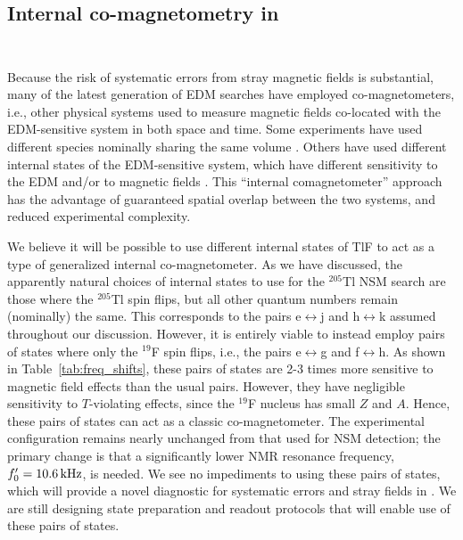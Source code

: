 \subsection{Internal co-magnetometry in \\ \CENTREX\ }
\label{Sec:InternalComagnetometry}

Because the risk of systematic errors from stray magnetic fields is substantial, many of the latest generation of EDM searches have employed co-magnetometers, i.e., other physical systems used to measure magnetic fields co-located with the EDM-sensitive system in both space and time.  Some experiments have used different species nominally sharing the same volume \cite{abel2020measurement,regan2002new}.  Others have used different internal states of the EDM-sensitive system, which have different sensitivity to the EDM and/or to magnetic fields \cite{EckelDeMillePbO_2013,andreev_improved_2018}.  This ``internal co\hyph magnetometer'' approach~\cite{DeMille2001Search} has the advantage of guaranteed spatial overlap between the two systems, and reduced experimental complexity.

We believe it will be possible to use different internal states of TlF to act as a type of generalized internal co-magnetometer. As we have discussed, the apparently natural choices of internal states to use for the $^{205}$Tl NSM search are those where the $^{205}$Tl spin flips, but all other quantum numbers remain (nominally) the same.  This corresponds to the pairs e$\leftrightarrow$j and  h$\leftrightarrow$k assumed throughout our discussion.  However, it is entirely viable to instead employ pairs of states where only the $^{19}$F spin flips, i.e., the pairs e$\leftrightarrow$g and f$\leftrightarrow$h.  As shown in Table~\ref{tab:freq_shifts}, these pairs of states are 2-3 times more sensitive to magnetic field effects than the usual pairs. However, they have negligible sensitivity to $T$-violating effects, since the $^{19}$F nucleus has small $Z$ and $A$.  Hence, these pairs of states can act as a classic co-magnetometer.  The experimental configuration remains nearly unchanged from that used for NSM detection; the primary change is that a significantly lower NMR resonance frequency, $f_0^\prime = 10.6\,\mathrm{kHz}$, is needed.  We see no impediments to using these pairs of states, which will provide a novel diagnostic for systematic errors and stray fields in \CENTREX. We are still designing state preparation and readout protocols that will enable use of these pairs of states.


